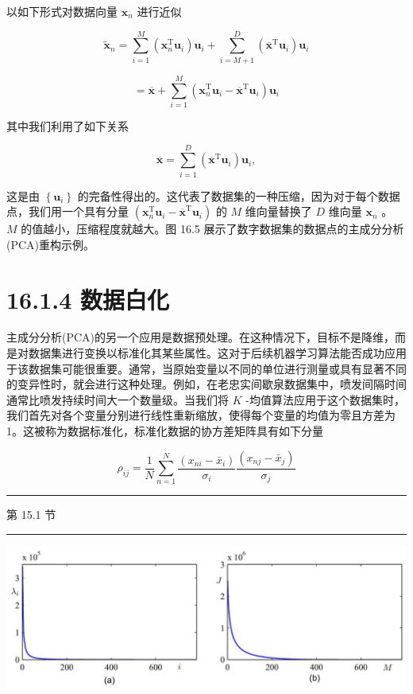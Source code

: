 \documentclass[10pt]{report}
\newcommand{\HRule}{\begin{center}\rule{0.9\linewidth}{0.2mm}\end{center}}
\begin{document}
以如下形式对数据向量 \({\mathbf{x}}_{n}\) 进行近似

\[
{\widetilde{\mathbf{x}}}_{n} = \mathop{\sum }\limits_{{i = 1}}^{M}\left( {{\mathbf{x}}_{n}^{\mathrm{T}}{\mathbf{u}}_{i}}\right) {\mathbf{u}}_{i} + \mathop{\sum }\limits_{{i = M + 1}}^{D}\left( {{\overline{\mathbf{x}}}^{\mathrm{T}}{\mathbf{u}}_{i}}\right) {\mathbf{u}}_{i} \tag{16.19}
\]

\[
= \overline{\mathbf{x}} + \mathop{\sum }\limits_{{i = 1}}^{M}\left( {{\mathbf{x}}_{n}^{\mathrm{T}}{\mathbf{u}}_{i} - {\overline{\mathbf{x}}}^{\mathrm{T}}{\mathbf{u}}_{i}}\right) {\mathbf{u}}_{i} \tag{16.20}
\]

其中我们利用了如下关系

\[
\overline{\mathbf{x}} = \mathop{\sum }\limits_{{i = 1}}^{D}\left( {{\overline{\mathbf{x}}}^{\mathrm{T}}{\mathbf{u}}_{i}}\right) {\mathbf{u}}_{i}, \tag{16.21}
\]

这是由 \(\left\{  {\mathbf{u}}_{i}\right\}\) 的完备性得出的。这代表了数据集的一种压缩，因为对于每个数据点，我们用一个具有分量 \(\left( {{\mathbf{x}}_{n}^{\mathrm{T}}{\mathbf{u}}_{i} - {\overline{\mathbf{x}}}^{\mathrm{T}}{\mathbf{u}}_{i}}\right)\) 的 \(M\) 维向量替换了 \(D\) 维向量 \({\mathbf{x}}_{n}\) 。 \(M\) 的值越小，压缩程度就越大。图 16.5 展示了数字数据集的数据点的主成分分析(PCA)重构示例。

\section*{16.1.4 数据白化}

主成分分析(PCA)的另一个应用是数据预处理。在这种情况下，目标不是降维，而是对数据集进行变换以标准化其某些属性。这对于后续机器学习算法能否成功应用于该数据集可能很重要。通常，当原始变量以不同的单位进行测量或具有显著不同的变异性时，就会进行这种处理。例如，在老忠实间歇泉数据集中，喷发间隔时间通常比喷发持续时间大一个数量级。当我们将 \(K\) -均值算法应用于这个数据集时，我们首先对各个变量分别进行线性重新缩放，使得每个变量的均值为零且方差为 1。这被称为数据标准化，标准化数据的协方差矩阵具有如下分量

\[
{\rho }_{ij} = \frac{1}{N}\mathop{\sum }\limits_{{n = 1}}^{N}\frac{\left( {x}_{ni} - {\bar{x}}_{i}\right) }{{\sigma }_{i}}\frac{\left( {x}_{nj} - {\bar{x}}_{j}\right) }{{\sigma }_{j}} \tag{16.22}
\]

\HRule

第 15.1 节

\HRule

\begin{center}
\includegraphics[max width=1.0\textwidth]{images/0194e279-9b28-703a-88f4-c3ac21e2010d_522_286_378_1258_445_0.jpg}
\end{center}
\hspace*{3em} 
\end{document}
